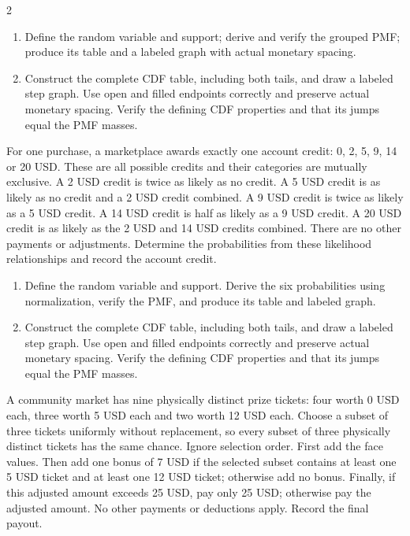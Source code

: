 \begin{multicols*}{2}
\begin{enumerate}[label=(\alph*)]
\item Define the random variable and support; derive and verify the grouped PMF; produce its table and a labeled graph with actual monetary spacing. 
\item Construct the complete CDF table, including both tails, and draw a labeled step graph. Use open and filled endpoints correctly and preserve actual monetary spacing. Verify the defining CDF properties and that its jumps equal the PMF masses. 
\end{enumerate}

For one purchase, a marketplace awards exactly one account credit: 0, 2, 5, 9, 14 or 20 USD. These are all possible credits and their categories are mutually exclusive. A 2 USD credit is twice as likely as no credit. A 5 USD credit is as likely as no credit and a 2 USD credit combined. A 9 USD credit is twice as likely as a 5 USD credit. A 14 USD credit is half as likely as a 9 USD credit. A 20 USD credit is as likely as the 2 USD and 14 USD credits combined. There are no other payments or adjustments. Determine the probabilities from these likelihood relationships and record the account credit.

\begin{enumerate}[label=(\alph*)]
\item Define the random variable and support. Derive the six probabilities using normalization, verify the PMF, and produce its table and labeled graph. 
\item Construct the complete CDF table, including both tails, and draw a labeled step graph. Use open and filled endpoints correctly and preserve actual monetary spacing. Verify the defining CDF properties and that its jumps equal the PMF masses. 
\end{enumerate}

\columnbreak
{}
A community market has nine physically distinct prize tickets: four worth 0 USD each, three worth 5 USD each and two worth 12 USD each. Choose a subset of three tickets uniformly without replacement, so every subset of three physically distinct tickets has the same chance. Ignore selection order. First add the face values. Then add one bonus of 7 USD if the selected subset contains at least one 5 USD ticket and at least one 12 USD ticket; otherwise add no bonus. Finally, if this adjusted amount exceeds 25 USD, pay only 25 USD; otherwise pay the adjusted amount. No other payments or deductions apply. Record the final payout.


\end{multicols*}
